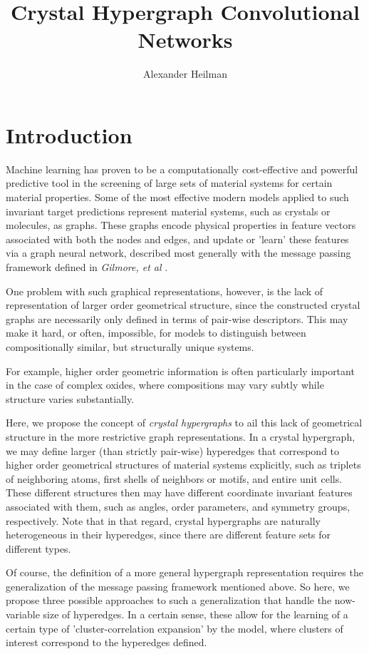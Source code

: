 \documentclass[10pt,a4paper]{article}
\title{Crystal Hypergraph Convolutional Networks}
\author{Alexander Heilman}
\begin{document}
\maketitle
\section{Introduction}
Machine learning has proven to be a computationally cost-effective and powerful predictive tool in the screening of large sets of material systems for certain material properties. Some of the most effective modern models applied to such invariant target predictions represent material systems, such as crystals or molecules, as graphs. These graphs encode physical properties in feature vectors associated with both the nodes and edges, and update or 'learn' these features via a graph neural network, described most generally with the message passing framework defined in \textit{Gilmore, et al} \cite{mpnn}. 

One problem with such graphical representations, however, is the lack of representation of larger order geometrical structure, since the constructed crystal graphs are necessarily only defined in terms of pair-wise descriptors. This may make it hard, or often, impossible, for models to distinguish between compositionally similar, but structurally unique systems. 

For example, higher order geometric information is often particularly important in the case of complex oxides, where compositions may vary subtly while structure varies substantially. 

Here, we propose the concept of \textit{crystal hypergraphs} to ail this lack of geometrical structure in the more restrictive graph representations. In a crystal hypergraph, we may define larger (than strictly pair-wise) hyperedges that correspond to higher order geometrical structures of material systems explicitly, such as triplets of neighboring atoms, first shells of neighbors or motifs, and entire unit cells. These different structures then may have different coordinate invariant features associated with them, such as angles, order parameters, and symmetry groups, respectively. Note that in that regard, crystal hypergraphs are naturally heterogeneous in their hyperedges, since there are different feature sets for different types.

Of course, the definition of a more general hypergraph representation requires the generalization of the message passing framework mentioned above. So here, we propose three possible approaches to such a generalization that handle the now-variable size of hyperedges. In a certain sense, these allow for the learning of a certain type of 'cluster-correlation expansion' by the model, where clusters of interest correspond to the hyperedges defined.
\end{document}
